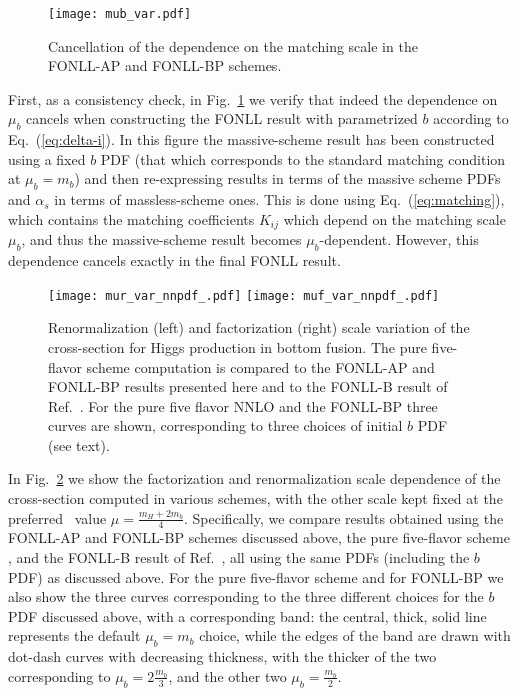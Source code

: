 \begin{figure}[htbp]
  \centering
  \texttt{[image: mub\_var.pdf]}
  \caption{Cancellation of the dependence on the matching scale in the
  FONLL-AP and FONLL-BP schemes.}
  \label{fig:mub-var}
\end{figure}
First, as a consistency check, in Fig.~\ref{fig:mub-var} we verify that
indeed the dependence on $\mu_b$ cancels when constructing the FONLL
result with parametrized $b$ according to Eq.~(\ref{eq:delta-i}). In
this figure the massive-scheme result has been constructed using a
fixed  $b$ PDF (that which corresponds to the standard matching
condition at $\mu_b=m_b$) and then re-expressing results in terms of
the massive scheme PDFs  and $\alpha_s$ in terms of massless-scheme
ones. This is done using Eq.~(\ref{eq:matching}), which contains the
matching coefficients $K_{ij}$ which depend on the matching scale
$\mu_b$, and thus the massive-scheme result becomes
$\mu_b$-dependent.
However, this dependence cancels exactly in the final
FONLL result.

\begin{figure}[htbp]
  \centering
  \texttt{[image: mur\_var\_nnpdf\_.pdf]}
  \texttt{[image: muf\_var\_nnpdf\_.pdf]}
  \caption{Renormalization (left) and factorization (right) scale
    variation of the cross-section for Higgs production in bottom
    fusion. The pure five-flavor scheme computation is compared to the
  FONLL-AP and FONLL-BP results presented here and to the FONLL-B
  result of Ref.~\cite{Forte:2015hba}. For the pure five flavor
  NNLO and the  FONLL-BP three curves are shown, corresponding to 
  three choices of initial $b$ PDF (see text).
  }
  \label{fig:scale-var}
\end{figure}


In Fig.~\ref{fig:scale-var} we show the factorization and
renormalization scale dependence of the cross-section computed in
various schemes, with the other scale kept fixed at the
preferred~\cite{Forte:2015hba,Forte:2016sja} value
$\mu=\frac{m_H+2m_b}{4}$.
Specifically, we compare results obtained using the FONLL-AP and
FONLL-BP schemes discussed above, the pure five-flavor scheme , and
the FONLL-B result of Ref.~\cite{Forte:2016sja}, all using the same
PDFs (including the $b$ PDF) as discussed above. For the pure
five-flavor scheme and for FONLL-BP we also show
the three curves corresponding to the three different choices for the
$b$ PDF discussed above, with a corresponding band:
the central, thick, solid line represents the default $\mu_b=m_b$
choice, while the edges of the band are drawn with dot-dash curves
with decreasing thickness, with the thicker of the two corresponding
to $\mu_b=2\frac{m_b}{3}$, and the other two $\mu_b=\frac{m_b}{2}$.

